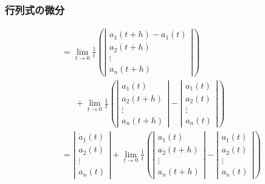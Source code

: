 \documentclass[10pt,hyperref={unicode}]{beamer}
\newcommand{\absolute}[1]{\left|#1\right|}
\newcommand{\parentheses}[1]{\left(#1\right)}
\begin{document}
\begin{frame}
\frametitle{行列式の微分}
\begin{align*}
    &= \lim_{t \to 0}\frac{1}{t}
    \parentheses{%
        \absolute{%
            \begin{array}{c}
                a_1\parentheses{t + h} - a_1\parentheses{t} \\
                a_2\parentheses{t + h} \\
                \vdots \\
                a_n\parentheses{t + h}
            \end{array}
        }
    } \\
    &\phantom{=}\ + \lim_{t \to 0}\frac{1}{t}
    \parentheses{%
        \absolute{%
            \begin{array}{c}
                a_1\parentheses{t} \\
                a_2\parentheses{t + h} \\
                \vdots \\
                a_n\parentheses{t + h}
            \end{array}
        }
        -
        \absolute{%
            \begin{array}{c}
                a_1\parentheses{t} \\
                a_2\parentheses{t} \\
                \vdots \\
                a_n\parentheses{t}
            \end{array}
        }
    } \\
    &= \absolute{%
            \begin{array}{c}
                \dot{a}_1\parentheses{t} \\
                a_2\parentheses{t} \\
                \vdots \\
                a_n\parentheses{t}
            \end{array}
    } + \lim_{t \to 0}\frac{1}{t}
    \parentheses{%
        \absolute{%
            \begin{array}{c}
                a_1\parentheses{t} \\
                a_2\parentheses{t + h} \\
                \vdots \\
                a_n\parentheses{t + h}
            \end{array}
        }
        -
        \absolute{%
            \begin{array}{c}
                a_1\parentheses{t} \\
                a_2\parentheses{t} \\
                \vdots \\
                a_n\parentheses{t}
            \end{array}
        }
    }
\end{align*}
\end{frame}
\end{document}
